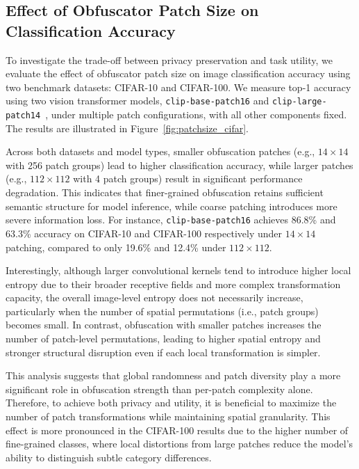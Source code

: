 \documentclass{ieeeaccess}
\begin{document}
\subsection{Effect of Obfuscator Patch Size on Classification Accuracy}
\label{sec:eval:patchsize}

To investigate the trade-off between privacy preservation and task utility, we evaluate the effect of obfuscator patch size on image classification accuracy using two benchmark datasets: CIFAR-10 and CIFAR-100. We measure top-1 accuracy using two vision transformer models, \texttt{clip-base-patch16} and \texttt{clip-large-patch14}~\cite{radford2021learningtransferablevisualmodels}, under multiple patch configurations, with all other components fixed. The results are illustrated in Figure~\ref{fig:patchsize_cifar}.

Across both datasets and model types, smaller obfuscation patches (e.g., $14\times14$ with 256 patch groups) lead to higher classification accuracy, while larger patches (e.g., $112\times112$ with 4 patch groups) result in significant performance degradation. This indicates that finer-grained obfuscation retains sufficient semantic structure for model inference, while coarse patching introduces more severe information loss. For instance, \texttt{clip-base-patch16} achieves 86.8\% and 63.3\% accuracy on CIFAR-10 and CIFAR-100 respectively under $14\times14$ patching, compared to only 19.6\% and 12.4\% under $112\times112$.

Interestingly, although larger convolutional kernels tend to introduce higher local entropy due to their broader receptive fields and more complex transformation capacity, the overall image-level entropy does not necessarily increase, particularly when the number of spatial permutations (i.e., patch groups) becomes small. In contrast, obfuscation with smaller patches increases the number of patch-level permutations, leading to higher spatial entropy and stronger structural disruption even if each local transformation is simpler.

This analysis suggests that global randomness and patch diversity play a more significant role in obfuscation strength than per-patch complexity alone. Therefore, to achieve both privacy and utility, it is beneficial to maximize the number of patch transformations while maintaining spatial granularity. This effect is more pronounced in the CIFAR-100 results due to the higher number of fine-grained classes, where local distortions from large patches reduce the model's ability to distinguish subtle category differences.
\end{document}

